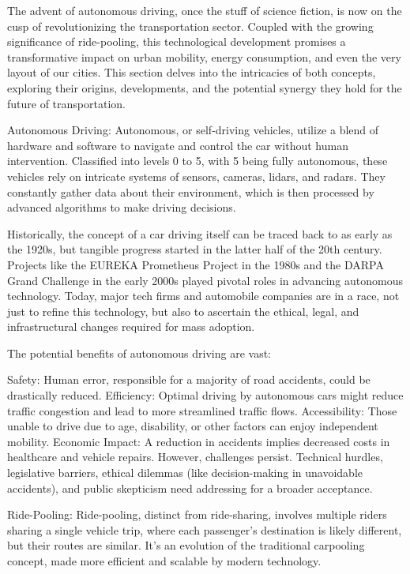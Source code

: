 The advent of autonomous driving, once the stuff of science fiction, is now on the cusp of revolutionizing the transportation sector. Coupled with the growing significance of ride-pooling, this technological development promises a transformative impact on urban mobility, energy consumption, and even the very layout of our cities. This section delves into the intricacies of both concepts, exploring their origins, developments, and the potential synergy they hold for the future of transportation.

Autonomous Driving:
Autonomous, or self-driving vehicles, utilize a blend of hardware and software to navigate and control the car without human intervention. Classified into levels 0 to 5, with 5 being fully autonomous, these vehicles rely on intricate systems of sensors, cameras, lidars, and radars. They constantly gather data about their environment, which is then processed by advanced algorithms to make driving decisions.

Historically, the concept of a car driving itself can be traced back to as early as the 1920s, but tangible progress started in the latter half of the 20th century. Projects like the EUREKA Prometheus Project in the 1980s and the DARPA Grand Challenge in the early 2000s played pivotal roles in advancing autonomous technology. Today, major tech firms and automobile companies are in a race, not just to refine this technology, but also to ascertain the ethical, legal, and infrastructural changes required for mass adoption.

The potential benefits of autonomous driving are vast:

Safety: Human error, responsible for a majority of road accidents, could be drastically reduced.
Efficiency: Optimal driving by autonomous cars might reduce traffic congestion and lead to more streamlined traffic flows.
Accessibility: Those unable to drive due to age, disability, or other factors can enjoy independent mobility.
Economic Impact: A reduction in accidents implies decreased costs in healthcare and vehicle repairs.
However, challenges persist. Technical hurdles, legislative barriers, ethical dilemmas (like decision-making in unavoidable accidents), and public skepticism need addressing for a broader acceptance.

Ride-Pooling:
Ride-pooling, distinct from ride-sharing, involves multiple riders sharing a single vehicle trip, where each passenger's destination is likely different, but their routes are similar. It's an evolution of the traditional carpooling concept, made more efficient and scalable by modern technology.

